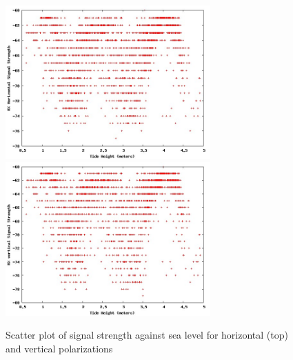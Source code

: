 \documentclass{amsart}
\begin{document}
\begin{figure}
\includegraphics[width=0.7\textwidth]{tidedata/rxpower0.jpg}
\includegraphics[width=0.7\textwidth]{tidedata/rxpower1.jpg}
\caption{Scatter plot of signal strength against sea level for
  horizontal (top) and vertical  polarizations}
\label{fig:rxpower}
\end{figure}
\end{document}
